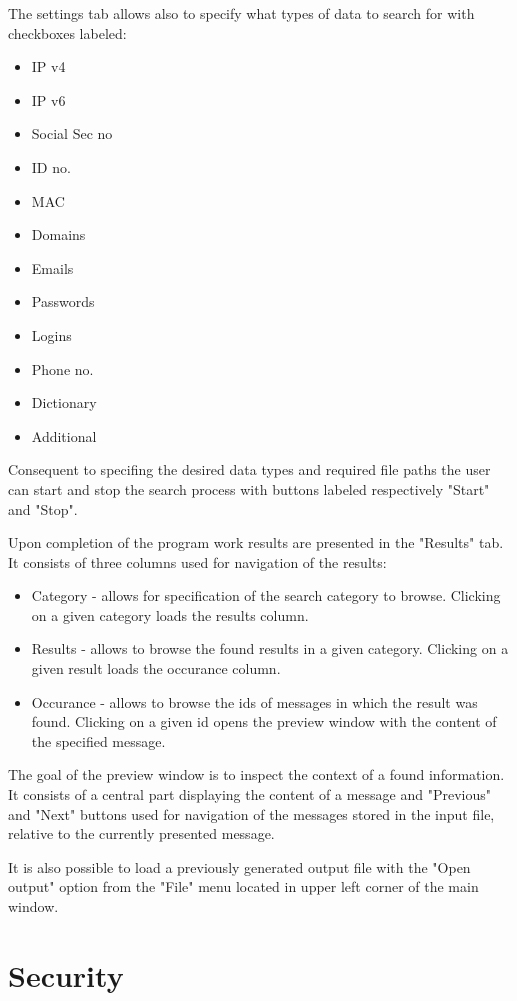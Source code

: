 \documentclass[a4paper,twoside,12pt]{book}
\begin{document}
The settings tab allows also to specify what types of data to search for with checkboxes labeled:

\begin{itemize}
   \item IP v4
   \item IP v6
   \item Social Sec no
   \item ID no.
   \item MAC
   \item Domains
   \item Emails
   \item Passwords
   \item Logins
   \item Phone no.
   \item Dictionary
   \item Additional
\end{itemize}

Consequent to specifing the desired data types and required file paths the user can start and stop the search process
with buttons labeled respectively "Start" and "Stop".

Upon completion of the program work results are presented in the "Results" tab. It consists of three columns used for
navigation of the results: 
\begin{itemize}
   \item Category - allows for specification of the search category to browse. Clicking on a given category loads
   the results column.
   \item Results - allows to browse the found results in a given category. Clicking on a given result loads the 
   occurance column.
   \item Occurance - allows to browse the ids of messages in which the result was found. Clicking on a given id
   opens the preview window with the content of the specified message.
\end{itemize}

The goal of the preview window is to inspect the context of a found information. It consists of a central part 
displaying the content of a message and "Previous" and "Next" buttons used for navigation of the messages stored
in the input file, relative to the currently presented message.

It is also possible to load a previously generated output file with the "Open output" option from the
"File" menu located in upper left corner of the main window.

\section{Security}
\end{document}
